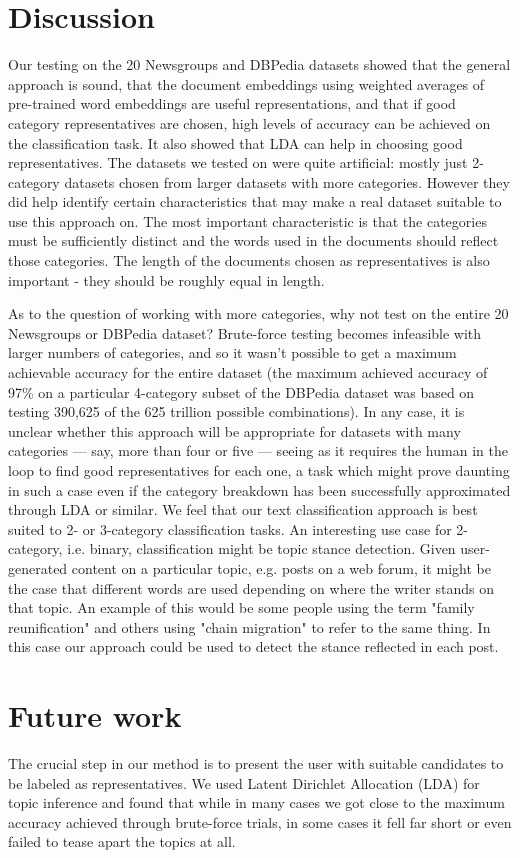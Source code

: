 \section{Discussion}
Our testing on the 20 Newsgroups and DBPedia datasets showed that the general approach is sound, that the document embeddings using weighted averages of pre-trained word embeddings are useful representations, and that if good category representatives are chosen, high levels of accuracy can be achieved on the classification task. It also showed that LDA can help in choosing good representatives. The datasets we tested on were quite artificial: mostly just 2-category datasets chosen from larger datasets with more categories. However they did help identify certain characteristics that may make a real dataset suitable to use this approach on. The most important characteristic is that the categories must be sufficiently distinct and the words used in the documents should reflect those categories. The length of the documents chosen as representatives is also important - they should be roughly equal in length.

As to the question of working with more categories, why not test on the entire 20 Newsgroups or DBPedia dataset? Brute-force testing becomes infeasible with larger numbers of categories, and so it wasn't possible to get a maximum achievable accuracy for the entire dataset (the maximum achieved accuracy of 97\% on a particular 4-category subset of the DBPedia dataset was based on testing 390,625 of the 625 trillion possible combinations). In any case, it is unclear whether this approach will be appropriate for datasets with many categories --- say, more than four or five --- seeing as it requires the human in the loop to find good representatives for each one, a task which might prove daunting in such a case even if the category breakdown has been successfully approximated through LDA or similar. We feel that our text classification approach is best suited to 2- or 3-category classification tasks. An interesting use case for 2-category, i.e. binary, classification might be topic stance detection. Given user-generated content on a particular topic, e.g. posts on a web forum, it might be the case that different words are used depending on where the writer stands on that topic. An example of this would be some people using the term "family reunification" and others using "chain migration" to refer to the same thing. In this case our approach could be used to detect the stance reflected in each post.

\section{Future work}
The crucial step in our method is to present the user with suitable candidates to be labeled as representatives. We used Latent Dirichlet Allocation (LDA) for topic inference and found that while in many cases we got close to the maximum accuracy achieved through brute-force trials, in some cases it fell far short or even failed to tease apart the topics at all.

